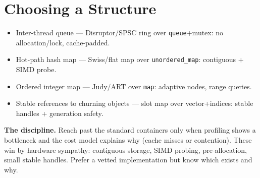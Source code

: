 \section{Choosing a Structure}
\begin{itemize}
\item Inter-thread queue --- Disruptor/SPSC ring over \texttt{queue}+mutex: no allocation/lock, cache-padded.
\item Hot-path hash map --- Swiss/flat map over \texttt{unordered\_map}: contiguous + SIMD probe.
\item Ordered integer map --- Judy/ART over \texttt{map}: adaptive nodes, range queries.
\item Stable references to churning objects --- slot map over vector+indices: stable handles + generation safety.
\end{itemize}

\textbf{The discipline.} Reach past the standard containers only when profiling shows a bottleneck and the cost model explains why (cache misses or contention). These win by hardware sympathy: contiguous storage, SIMD probing, pre-allocation, small stable handles. Prefer a vetted implementation but know which exists and why.
